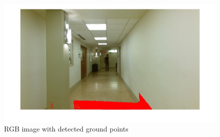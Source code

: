\documentclass[fleqn,10pt]{SelfArx} %
\begin{document}
\begin{figure}[htbp]
\centering
\includegraphics[scale=0.2]{rgb.jpg}
\caption{RGB image with detected ground points}
\label{fig:rgb}
\end{figure}
\end{document}
